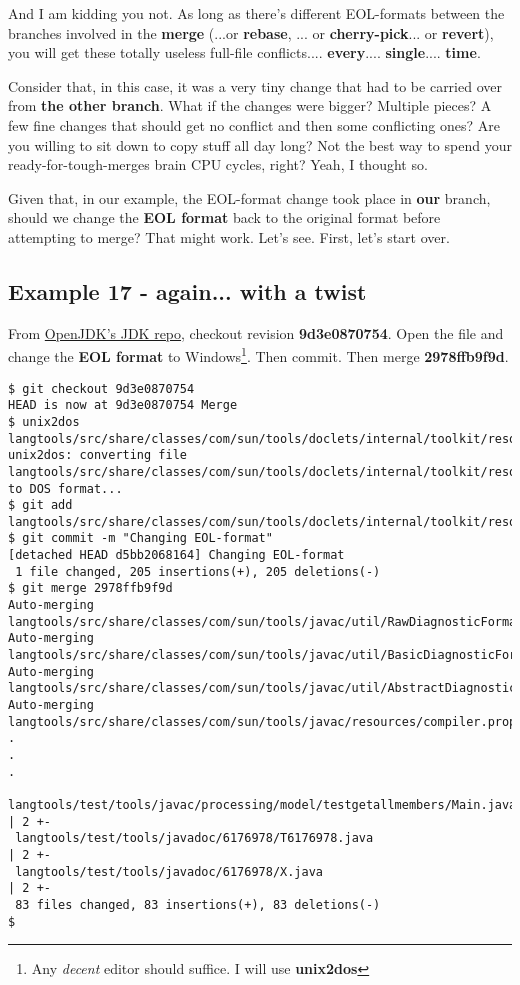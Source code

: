 And I am kidding you not. As long as there's different EOL-formats between the branches involved in the {\bf merge}
(...or {\bf rebase}, ... or {\bf cherry-pick}... or {\bf revert}), you will get these totally useless full-file conflicts....
{\bf every}.... {\bf single}.... {\bf time}.

Consider that, in this case, it was a very tiny change that had to be carried over from {\bf the other branch}. What if
the changes were bigger? Multiple pieces? A few fine changes that should get no conflict and then some conflicting ones?
Are you willing to sit down to copy stuff all day long? Not the best way to spend your ready-for-tough-merges brain CPU
cycles, right? Yeah, I thought so.

Given that, in our example, the EOL-format change took place in {\bf our} branch, should we change the {\bf EOL format}
back to the original format before attempting to merge? That might work. Let's see. First, let's start over.

\subsection{Example 17 - again... with a twist}

From \hyperref[openjdk_repo]{OpenJDK's JDK repo}, checkout revision {\bf 9d3e0870754}. Open the file and change the
{\bf EOL format} to Windows\footnote{Any {\it decent} editor should suffice. I will use {\bf unix2dos}}. Then commit.
Then merge {\bf 2978ffb9f9d}.

\begin{lstlisting}[style=console_style,
	basicstyle=\small,
	caption={\bf example 17} - trying merge again]
$ git checkout 9d3e0870754
HEAD is now at 9d3e0870754 Merge
$ unix2dos langtools/src/share/classes/com/sun/tools/doclets/internal/toolkit/resources/doclet.xml
unix2dos: converting file langtools/src/share/classes/com/sun/tools/doclets/internal/toolkit/resources/doclet.xml to DOS format...
$ git add langtools/src/share/classes/com/sun/tools/doclets/internal/toolkit/resources/doclet.xml
$ git commit -m "Changing EOL-format"
[detached HEAD d5bb2068164] Changing EOL-format
 1 file changed, 205 insertions(+), 205 deletions(-)
$ git merge 2978ffb9f9d
Auto-merging langtools/src/share/classes/com/sun/tools/javac/util/RawDiagnosticFormatter.java
Auto-merging langtools/src/share/classes/com/sun/tools/javac/util/BasicDiagnosticFormatter.java
Auto-merging langtools/src/share/classes/com/sun/tools/javac/util/AbstractDiagnosticFormatter.java
Auto-merging langtools/src/share/classes/com/sun/tools/javac/resources/compiler.properties
.
.
.
 langtools/test/tools/javac/processing/model/testgetallmembers/Main.java                                | 2 +-
 langtools/test/tools/javadoc/6176978/T6176978.java                                                     | 2 +-
 langtools/test/tools/javadoc/6176978/X.java                                                            | 2 +-
 83 files changed, 83 insertions(+), 83 deletions(-)
$
\end{lstlisting}

